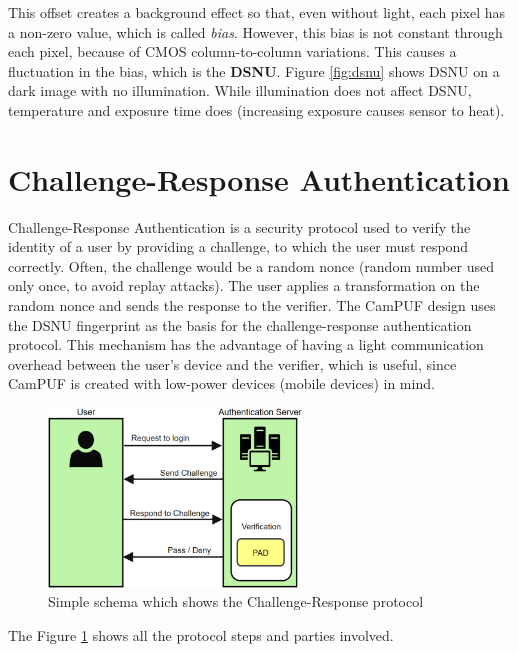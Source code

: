 This offset creates a background effect so that, even without light, each pixel has a non-zero value, which is called \textit{bias}.
However, this bias is not constant through each pixel, because of CMOS column-to-column variations. This causes a fluctuation in the bias, which is the \textbf{DSNU}.
Figure \ref{fig:dsnu} shows DSNU on a dark image with no illumination. While illumination does not affect DSNU, temperature and exposure time does (increasing exposure causes sensor to heat).

\section{Challenge-Response Authentication}

Challenge-Response Authentication is a security protocol used to verify the identity of a user by providing a challenge, to which the user must respond correctly.
Often, the challenge would be a random nonce (random number used only once, to avoid replay attacks). The user applies a transformation on the random nonce and sends the response to the verifier.
The CamPUF design uses the DSNU fingerprint as the basis for the challenge-response authentication protocol.
This mechanism has the advantage of having a light communication overhead between the user's device and the verifier, which is useful, since CamPUF is created with low-power devices (mobile devices) in mind.

\begin{figure}[h!]                      
    \centering
    \includegraphics[width=0.6\textwidth]{images/Challenge_Response_Auth.png}
    \caption{Simple schema which shows the Challenge-Response protocol}
    \label{fig:cr_auth}
\end{figure}

The Figure \ref{fig:cr_auth} shows all the protocol steps and parties involved.
